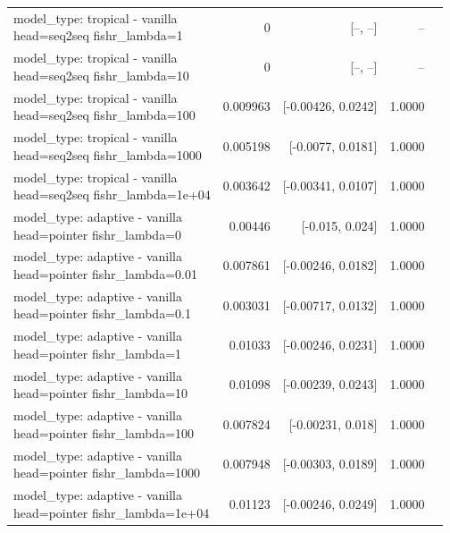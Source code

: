 \documentclass[10pt]{article}
\makeatletter
\newcommand{\stackcell}[1]{\begin{tabular}[t]{@{}l@{}}#1\end{tabular}}
\makeatother
\begin{document}
{\begin{longtable}{lrrrl}
\stackcell{model\_type: tropical - vanilla\\\footnotesize head=seq2seq fishr\_lambda=1 } & 0 & [--, --] & -- & \\
\stackcell{model\_type: tropical - vanilla\\\footnotesize head=seq2seq fishr\_lambda=10 } & 0 & [--, --] & -- & \\
\stackcell{model\_type: tropical - vanilla\\\footnotesize head=seq2seq fishr\_lambda=100 } & 0.009963 & [-0.00426, 0.0242] & 1.0000 & \\
\stackcell{model\_type: tropical - vanilla\\\footnotesize head=seq2seq fishr\_lambda=1000 } & 0.005198 & [-0.0077, 0.0181] & 1.0000 & \\
\stackcell{model\_type: tropical - vanilla\\\footnotesize head=seq2seq fishr\_lambda=1e+04 } & 0.003642 & [-0.00341, 0.0107] & 1.0000 & \\
\stackcell{model\_type: adaptive - vanilla\\\footnotesize head=pointer fishr\_lambda=0 } & 0.00446 & [-0.015, 0.024] & 1.0000 & \\
\stackcell{model\_type: adaptive - vanilla\\\footnotesize head=pointer fishr\_lambda=0.01 } & 0.007861 & [-0.00246, 0.0182] & 1.0000 & \\
\stackcell{model\_type: adaptive - vanilla\\\footnotesize head=pointer fishr\_lambda=0.1 } & 0.003031 & [-0.00717, 0.0132] & 1.0000 & \\
\stackcell{model\_type: adaptive - vanilla\\\footnotesize head=pointer fishr\_lambda=1 } & 0.01033 & [-0.00246, 0.0231] & 1.0000 & \\
\stackcell{model\_type: adaptive - vanilla\\\footnotesize head=pointer fishr\_lambda=10 } & 0.01098 & [-0.00239, 0.0243] & 1.0000 & \\
\stackcell{model\_type: adaptive - vanilla\\\footnotesize head=pointer fishr\_lambda=100 } & 0.007824 & [-0.00231, 0.018] & 1.0000 & \\
\stackcell{model\_type: adaptive - vanilla\\\footnotesize head=pointer fishr\_lambda=1000 } & 0.007948 & [-0.00303, 0.0189] & 1.0000 & \\
\stackcell{model\_type: adaptive - vanilla\\\footnotesize head=pointer fishr\_lambda=1e+04 } & 0.01123 & [-0.00246, 0.0249] & 1.0000 & \\

\end{longtable}}
\end{document}
